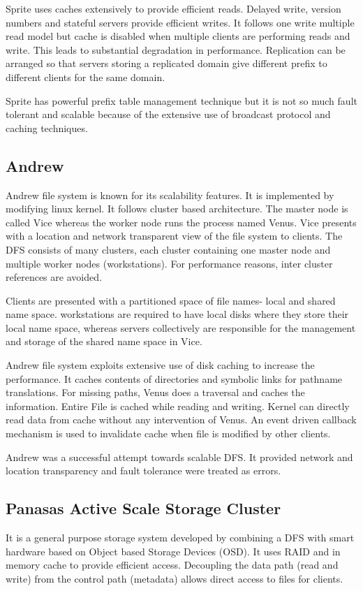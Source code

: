 \documentclass[a4paper,12pt]{article}
\begin{document}
Sprite uses caches extensively to provide efficient reads. Delayed write, version numbers and stateful servers provide efficient writes. It follows one write multiple read model but cache is disabled when multiple clients are performing reads and write. This leads to substantial degradation in performance. Replication can be arranged so that servers storing a replicated domain give different prefix to different clients for the same domain.

Sprite has powerful prefix table management technique but it is not so much fault tolerant and scalable because of the extensive use of broadcast protocol and caching techniques.

\subsection{Andrew \cite[p.~360]{old_dfs}}
\label{sec:andrew}
Andrew file system is known for its scalability features. It is implemented by modifying linux kernel. It follows cluster based architecture. The master node is called Vice whereas the worker node runs the process named Venus. Vice presents with a location and network transparent view of the file system to clients. The DFS consists of many clusters, each cluster containing one master node and multiple worker nodes (workstations). For performance reasons, inter cluster references are avoided.

Clients are presented with a partitioned space of file names- local and shared name space. workstations are required to have local disks where they store their local name space, whereas servers collectively are responsible for the management and storage of the shared name space in Vice.

Andrew file system exploits extensive use of disk caching to increase the performance. It caches contents of directories and symbolic links for pathname translations. For missing paths, Venus does a traversal and caches the information. Entire File is cached while reading and writing. Kernel can directly read data from cache without any intervention of Venus. An event driven callback mechanism is used to invalidate cache when file is modified by other clients.

Andrew was a successful attempt towards scalable DFS. It provided network and location transparency and fault tolerance were treated as errors.

\subsection{Panasas Active Scale Storage Cluster \cite{panasas}}
\label{sec:panasas}
It is a general purpose storage system developed by combining a DFS with smart hardware based on Object based Storage Devices (OSD). It uses RAID and in memory cache to provide efficient access. Decoupling the data path (read and write) from the control path (metadata) allows direct access to files for clients.
\end{document}
